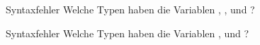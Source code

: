 \begin{task}{Syntaxfehler}
    Welche Typen haben die Variablen , ,  und ?

    \begin{solution}
    \end{solution}
\end{task}

\begin{task}{Syntaxfehler}
    Welche Typen haben die Variablen ,  und ?

    \begin{solution}
    \end{solution}
\end{task}

